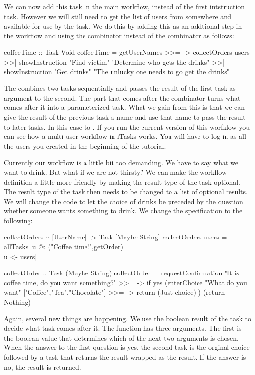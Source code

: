 \documentclass[a4paper,11pt]{article}
\begin{document}
We can now add this task in the main workflow, instead of the first intstruction task. However we will still need to get the list of users from somewhere and available for use by the  task. We do this by adding this as an addtional step in the workflow and using the \CleanInline{>>=} combinator instead of the \CleanInline{>>|} combinator as follows:
\begin{CleanCodeN}
coffeeTime :: Task Void
coffeeTime
 =   getUserNames
 >>= \users ->
     collectOrders users
 >>| showInstruction "Find victim" "Determine who gets the drinks"
 >>| showInstruction "Get drinks" "The unlucky one needs to go get the drinks"
\end{CleanCodeN}
The \CleanInline{>>=} combines two tasks sequentially and passes the result of the first task as argument to the second. The \CleanInline{\\users ->} part that comes after the \CleanInline{>>=} combinator turns what comes after it into a parameterized task. What we gain from this is that we can give the result of the previous task a name and use that name to pass the result to later tasks. In this case to . If you run the current version of this worfklow you can see how a multi user workflow in iTasks works. You will have to log in as all the users you created in the beginning of the tutorial.

Currently our workflow is a little bit too demanding. We have to say what we want to drink. But what if we are not thirsty? We can make the workflow definition a little more friendly by making the result type of the  task optional. The result type of the  task then needs to be changed to a list of optional results. We will change the code to let the choice of drinks be preceded by the question whether someone wants something to drink. We change the specification to the following:
\begin{CleanCodeN}
collectOrders :: [UserName] -> Task [Maybe String] 
collectOrders users = allTasks [u @: ("Coffee time!",getOrder) \\ u <- users]

collectOrder :: Task (Maybe String)
collectOrder
    =   requestConfirmation "It is coffee time, do you want something?"
    >>= \yes -> if yes
        (enterChoice "What do you want" ["Coffee","Tea","Chocolate"]
         >>= \choice -> return (Just choice)
        )
        (return Nothing)
\end{CleanCodeN}
Again, several new things are happening. We use the boolean result of the  task to decide what task comes after it.
The  function has three arguments. The first is the boolean value that determines which of the next two arguments is chosen. When the answer to the first question is yes, the second task is the orginal choice followed by a task that returns the result wrapped as  the result. If the answer is no, the result  is returned.
\end{document}
